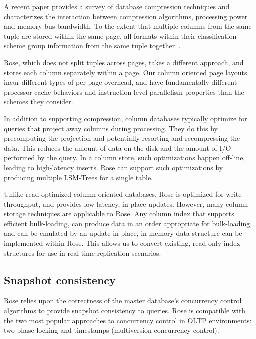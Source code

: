 \documentclass{vldb}
\newcommand{\rows}{Rose\xspace}
\begin{document}
A recent paper provides a survey of database compression
techniques and characterizes the interaction between compression
algorithms, processing power and memory bus bandwidth.  To the extent
that multiple columns from the same tuple are stored within the same
page, all formats within their classification scheme group information
from the same tuple together~\cite{bitsForChronos}.

\rows, which does not split tuples across pages, takes a different
approach, and stores each column separately within a page.  Our column
oriented page layouts incur different types of per-page overhead, and
have fundamentally different processor
cache behaviors and instruction-level parallelism properties than the
schemes they consider.

In addition to supporting compression, column databases typically
optimize for queries that project away columns during processing.
They do this by precomputing the projection and potentially resorting
and recompressing the data.  This reduces the amount of data on the
disk and the amount of I/O performed by the query.  In a
column store, such optimizations happen off-line, leading to
high-latency inserts.  \rows can support such optimizations by
producing multiple LSM-Trees for a single table.

Unlike read-optimized column-oriented databases, \rows is optimized
for write throughput, and provides low-latency, in-place updates.
However, many column storage techniques are applicable to \rows.  Any
column index that supports efficient bulk-loading, can produce data in
an order appropriate for bulk-loading, and can be emulated by an
update-in-place, in-memory data structure can be implemented within
\rows.  This allows us to convert existing, read-only index structures
for use in real-time replication scenarios.


\subsection{Snapshot consistency}

\rows relies upon the correctness of the master database's concurrency
control algorithms to provide snapshot consistency to queries.  \rows
is compatible with the two most popular approaches to concurrency
control in OLTP environments: two-phase locking and timestamps
(multiversion concurrency control).
\end{document}
